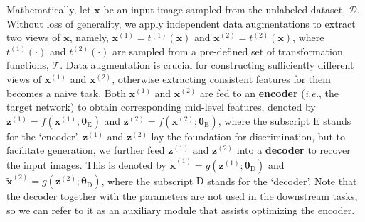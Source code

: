 \documentclass[10pt,twocolumn,letterpaper]{article}
\begin{document}
Mathematically, let $\mathbf{x}$ be an input image sampled from the unlabeled dataset, $\mathcal{D}$. Without loss of generality, we apply independent data augmentations to extract two views of $\mathbf{x}$, namely, $\mathbf{x}^{(1)}=t^{(1)}(\mathbf{x})$ and $\mathbf{x}^{(2)}=t^{(2)}(\mathbf{x})$, where $t^{(1)}(\cdot)$ and $t^{(2)}(\cdot)$ are sampled from a pre-defined set of transformation functions, $\mathcal{T}$. Data augmentation is crucial for constructing sufficiently different views of $\mathbf{x}^{(1)}$ and $\mathbf{x}^{(2)}$, otherwise extracting consistent features for them becomes a naive task. Both $\mathbf{x}^{(1)}$ and $\mathbf{x}^{(2)}$ are fed to an \textbf{encoder} (\textit{i.e.}, the target network) to obtain corresponding mid-level features, denoted by $\mathbf{z}^{(1)}=f(\mathbf{x}^{(1)};\boldsymbol{\theta}_\mathrm{E})$ and $\mathbf{z}^{(2)}=f(\mathbf{x}^{(2)};\boldsymbol{\theta}_\mathrm{E})$, where the subscript $\mathrm{E}$ stands for the `encoder'. $\mathbf{z}^{(1)}$ and $\mathbf{z}^{(2)}$ lay the foundation for discrimination, but to facilitate generation, we further feed $\mathbf{z}^{(1)}$ and $\mathbf{z}^{(2)}$ into a \textbf{decoder} to recover the input images. This is denoted by $\tilde{\mathbf{x}}^{(1)}={g(\mathbf{z}^{(1)};\boldsymbol{\theta}_\mathrm{D})}$ and $\tilde{\mathbf{x}}^{(2)}={g(\mathbf{z}^{(2)};\boldsymbol{\theta}_\mathrm{D})}$, where the subscript $\mathrm{D}$ stands for the `decoder'. Note that the decoder together with the parameters are not used in the downstream tasks, so we can refer to it as an auxiliary module that assists optimizing the encoder.
\end{document}
